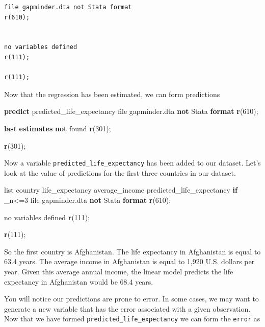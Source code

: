 \documentclass[
]{book}
\newenvironment{Shaded}{\begin{snugshade}}{\end{snugshade}}
\newcommand{\DataTypeTok}[1]{\textcolor[rgb]{0.13,0.29,0.53}{#1}}
\newcommand{\FunctionTok}[1]{\textcolor[rgb]{0.13,0.29,0.53}{\textbf{#1}}}
\newcommand{\KeywordTok}[1]{\textcolor[rgb]{0.13,0.29,0.53}{\textbf{#1}}}
\newcommand{\NormalTok}[1]{#1}
\newcommand{\OtherTok}[1]{\textcolor[rgb]{0.56,0.35,0.01}{#1}}
\begin{document}
\begin{verbatim}
file gapminder.dta not Stata format
r(610);


no variables defined
r(111);

r(111);
\end{verbatim}

Now that the regression has been estimated, we can form predictions

\begin{Shaded}
\begin{Highlighting}[]
\KeywordTok{predict}\NormalTok{ predicted\_life\_expectancy}
\NormalTok{file gapminder.dta }\KeywordTok{not}\NormalTok{ Stata }\KeywordTok{format}
\FunctionTok{r}\NormalTok{(610);}


\FunctionTok{last} \KeywordTok{estimates} \KeywordTok{not}\NormalTok{ found}
\FunctionTok{r}\NormalTok{(301);}

\FunctionTok{r}\NormalTok{(301);}
\end{Highlighting}
\end{Shaded}

Now a variable \texttt{predicted\_life\_expectancy} has been added to our dataset. Let's look at the value of predictions for the first three countries in our dataset.

\begin{Shaded}
\begin{Highlighting}[]
\OtherTok{list}\NormalTok{ country life\_expectancy average\_income predicted\_life\_expectancy }\KeywordTok{if} \DataTypeTok{\_n}\NormalTok{\textless{}=3}
\NormalTok{file gapminder.dta }\KeywordTok{not}\NormalTok{ Stata }\KeywordTok{format}
\FunctionTok{r}\NormalTok{(610);}


\NormalTok{no variables defined}
\FunctionTok{r}\NormalTok{(111);}

\FunctionTok{r}\NormalTok{(111);}
\end{Highlighting}
\end{Shaded}

So the first country is Afghanistan. The life expectancy in Afghanistan is equal to 63.4 years. The average income in Afghanistan is equal to 1,920 U.S. dollars per year. Given this average annual income, the linear model predicts the life expectancy in Afghanistan would be 68.4 years.

You will notice our predictions are prone to error. In some cases, we may want to generate a new variable that has the error associated with a given observation. Now that we have formed \texttt{predicted\_life\_expectancy} we can form the \texttt{error} as
\end{document}
